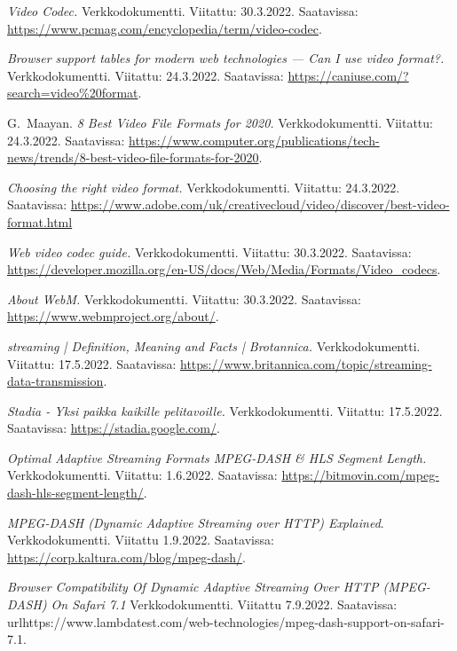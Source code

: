 \documentclass[finnish, 12pt, a4paper, elec, utf8, a-1b, online]{aaltothesis}
\begin{document}
\begin{thebibliography}{99}
    \textit{Video Codec.}
    Verkkodokumentti.
    Viitattu: 30.3.2022.
    Saatavissa: \url{https://www.pcmag.com/encyclopedia/term/video-codec}.

    \textit{Browser support tables for modern web technologies — Can I use video format?.}
    Verkkodokumentti.
    Viitattu: 24.3.2022.
    Saatavissa: \url{https://caniuse.com/?search=video%20format}.

    G.\ Maayan.
    \textit{8 Best Video File Formats for 2020.}
    Verkkodokumentti.
    Viitattu: 24.3.2022.
    Saatavissa: \url{https://www.computer.org/publications/tech-news/trends/8-best-video-file-formats-for-2020}.

    \textit{Choosing the right video format.}
    Verkkodokumentti.
    Viitattu: 24.3.2022.
    Saatavissa: \url{https://www.adobe.com/uk/creativecloud/video/discover/best-video-format.html}

    \textit{Web video codec guide.}
    Verkkodokumentti.
    Viitattu: 30.3.2022.
    Saatavissa: \url{https://developer.mozilla.org/en-US/docs/Web/Media/Formats/Video_codecs}.

    \textit{About WebM.}
    Verkkodokumentti.
    Viitattu: 30.3.2022.
    Saatavissa: \url{https://www.webmproject.org/about/}.

    \textit{streaming | Definition, Meaning and Facts | Brotannica.}
    Verkkodokumentti.
    Viitattu: 17.5.2022.
    Saatavissa: \url{https://www.britannica.com/topic/streaming-data-transmission}.

    \textit{Stadia - Yksi paikka kaikille pelitavoille.}
    Verkkodokumentti.
    Viitattu: 17.5.2022.
    Saatavissa: \url{https://stadia.google.com/}.

    \textit{Optimal Adaptive Streaming Formats MPEG-DASH & HLS Segment Length.}
    Verkkodokumentti.
    Viitattu: 1.6.2022.
    Saatavissa: \url{https://bitmovin.com/mpeg-dash-hls-segment-length/}.

    \textit{MPEG-DASH (Dynamic Adaptive Streaming over HTTP) Explained}.
    Verkkodokumentti.
    Viitattu 1.9.2022.
    Saatavissa: \url{https://corp.kaltura.com/blog/mpeg-dash/}.

    \textit{Browser Compatibility Of Dynamic Adaptive Streaming Over HTTP (MPEG-DASH) On Safari 7.1}
    Verkkodokumentti.
    Viitattu 7.9.2022.
    Saatavissa: url{https://www.lambdatest.com/web-technologies/mpeg-dash-support-on-safari-7.1}.


\end{thebibliography}
\end{document}
